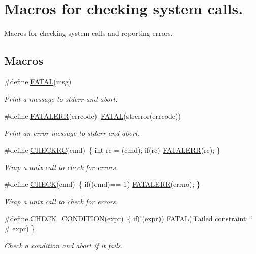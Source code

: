 \hypertarget{group__check__macros}{\section{Macros for checking system calls.}
\label{group__check__macros}
}


Macros for checking system calls and reporting errors.  


\subsection*{Macros}
\begin{DoxyCompactItemize}
\item 
\#define \hyperlink{group__check__macros_ga7a3e1d362790a375466c5e77a6d5c9c5}{F\-A\-T\-A\-L}(msg)
\begin{DoxyCompactList}\small\item\em Print a message to stderr and abort. \end{DoxyCompactList}\item 
\#define \hyperlink{group__check__macros_gab2b3925a76d34a1272ace73af5a81945}{F\-A\-T\-A\-L\-E\-R\-R}(errcode)~\hyperlink{group__check__macros_ga7a3e1d362790a375466c5e77a6d5c9c5}{F\-A\-T\-A\-L}(strerror(errcode))
\begin{DoxyCompactList}\small\item\em Print an error message to stderr and abort. \end{DoxyCompactList}\item 
\#define \hyperlink{group__check__macros_ga879857ca00d32faa0d6cfe416428a804}{C\-H\-E\-C\-K\-R\-C}(cmd)~\{ int rc = (cmd); if(rc) \hyperlink{group__check__macros_gab2b3925a76d34a1272ace73af5a81945}{F\-A\-T\-A\-L\-E\-R\-R}(rc); \}
\begin{DoxyCompactList}\small\item\em Wrap a unix call to check for errors. \end{DoxyCompactList}\item 
\#define \hyperlink{group__check__macros_ga1992445028206dcca9c93c9a0b558436}{C\-H\-E\-C\-K}(cmd)~\{ if((cmd)==-\/1) \hyperlink{group__check__macros_gab2b3925a76d34a1272ace73af5a81945}{F\-A\-T\-A\-L\-E\-R\-R}(errno); \}
\begin{DoxyCompactList}\small\item\em Wrap a unix call to check for errors. \end{DoxyCompactList}\item 
\#define \hyperlink{group__check__macros_ga6196238e8ab53ab90e7bf7ab51fc73e9}{C\-H\-E\-C\-K\-\_\-\-C\-O\-N\-D\-I\-T\-I\-O\-N}(expr)~\{ if(!(expr)) \hyperlink{group__check__macros_ga7a3e1d362790a375466c5e77a6d5c9c5}{F\-A\-T\-A\-L}(\char`\"{}Failed constraint\-: \char`\"{} \# expr) \}
\begin{DoxyCompactList}\small\item\em Check a condition and abort if it fails. \end{DoxyCompactList}\end{DoxyCompactItemize}

